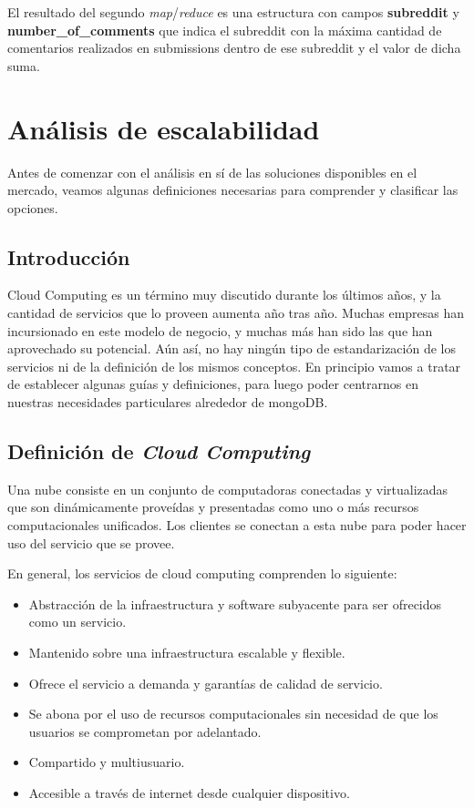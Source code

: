 \documentclass[a4paper,10pt,twoside]{article}
\newcommand{\map}{\emph{map}\xspace}
\newcommand{\reduce}{\emph{reduce}\xspace}
\begin{document}
El resultado del segundo \map/\reduce es una estructura con campos \textbf{subreddit} y \textbf{number\_of\_comments} que indica el subreddit con la máxima cantidad de comentarios realizados en submissions dentro de ese subreddit y el valor de dicha suma.




\section{Análisis de escalabilidad}

Antes de comenzar con el análisis en sí de las soluciones disponibles en el mercado, veamos algunas definiciones necesarias para comprender y clasificar las opciones.


\subsection{Introducción}

Cloud Computing es un término muy discutido durante los últimos años, y la cantidad de servicios que lo proveen aumenta año tras año. Muchas empresas han incursionado en este modelo de negocio, y muchas más han sido las que han aprovechado su potencial. Aún así, no hay ningún tipo de estandarización de los servicios ni de la definición de los mismos conceptos. En principio vamos a tratar de establecer algunas guías y definiciones, para luego poder centrarnos en nuestras necesidades particulares alrededor de mongoDB.


\subsection{Definición de \emph{Cloud Computing}}

Una nube consiste en un conjunto de computadoras conectadas y virtualizadas que son dinámicamente proveídas y presentadas como uno o más recursos computacionales unificados. Los clientes se conectan a esta nube para poder hacer uso del servicio que se provee.

En general, los servicios de cloud computing comprenden lo siguiente:

\begin{itemize}
	\item Abstracción de la infraestructura y software subyacente para ser ofrecidos como un servicio.
	\item Mantenido sobre una infraestructura escalable y flexible.
	\item Ofrece el servicio a demanda y garantías de calidad de servicio.
	\item Se abona por el uso de recursos computacionales sin necesidad de que los usuarios se comprometan por adelantado.
	\item Compartido y multiusuario.
	\item Accesible a través de internet desde cualquier dispositivo.
\end{itemize}
\end{document}
